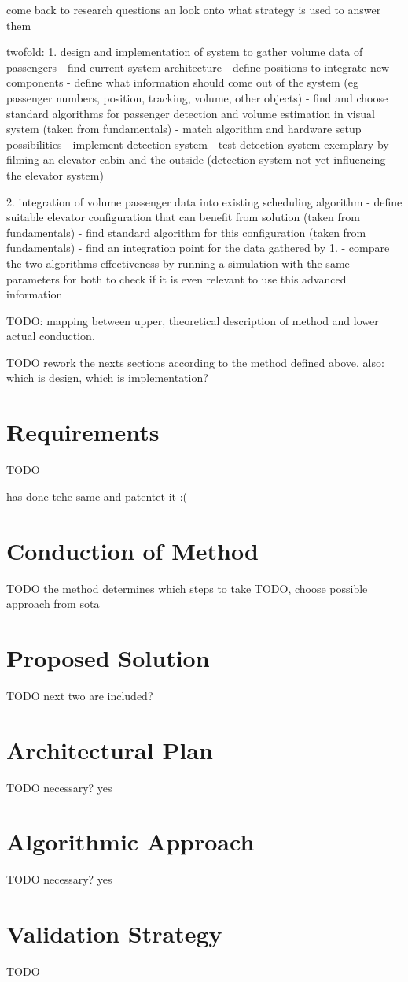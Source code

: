 come back to research questions an look onto what strategy is used to answer them

twofold:
1. design and implementation of system to gather volume data of passengers
 - find current system architecture
 - define positions to integrate new components
 - define what information should come out of the system
 (eg passenger numbers, position, tracking, volume, other objects)
 - find and choose standard algorithms for passenger detection and volume estimation in visual system (taken from fundamentals)
 - match algorithm and hardware setup possibilities
 - implement detection system
 - test detection system exemplary by filming an elevator cabin and the outside (detection system not yet influencing the elevator system)
 
2. integration of volume passenger data into existing scheduling algorithm
 - define suitable elevator configuration that can benefit from solution (taken from fundamentals) 
 - find standard algorithm for this configuration (taken from fundamentals)
 - find an integration point for the data gathered by 1.
 - compare the two algorithms effectiveness by running a simulation with the same parameters for both to check if it is even relevant to use this advanced information
 
 TODO: mapping between upper, theoretical description of method and  lower actual conduction.
 
 
 TODO rework the nexts sections according to the method defined above, also: which is design, which is implementation?

\section{Requirements}
TODO

\autocite[][]{xang2016trafficlist} has done tehe same and patentet it :(

\section{Conduction of Method}
TODO the method determines which steps to take
TODO, choose possible approach from sota

\section{Proposed Solution}
TODO next two are included?

\section{Architectural Plan}
TODO necessary? yes

\section{Algorithmic Approach}
TODO necessary? yes

\section{Validation Strategy}

TODO